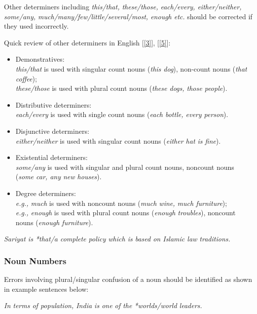 \documentclass[12pt]{article}
\begin{document}
Other determiners including {\it this/that, these/those, each/every, either/neither, some/any, much/many/few/little/several/most, enough etc.} should be corrected if they used incorrectly.  

Quick review of other determiners in English [\ref{3}], [\ref{5}]:
\begin{itemize}[-]
\item Demonstratives: \\
{\it this/that} is used with singular count nouns ({\it this dog}), non-count nouns ({\it that coffee});\\
{\it these/those} is used with plural count nouns ({\it these dogs, those people}).

\item Distributive determiners: \\
{\it each/every} is used with single count nouns ({\it each bottle, every person}).

\item Disjunctive determiners: \\
{\it either/neither} is used with singular count nouns ({\it either hat is fine}).

\item Existential determiners: \\
{\it some/any} is used with singular and plural count nouns, noncount nouns ({\it some car, any new houses}).

\item Degree determiners: \\
{\it e.g., much} is used with noncount nouns ({\it much wine, much furniture});\\
{\it e.g., enough} is used with plural count nouns ({\it enough troubles}), noncount nouns ({\it enough furniture}).
\end{itemize}

{\it Sariyat is *that/a complete policy which is based on Islamic law traditions.}

\subsubsection{Noun Numbers}
Errors involving plural/singular confusion of a noun should be identified as shown in example sentences below:


{\it In terms of population, India is one of the *worlds/world leaders.}

\end{document}
